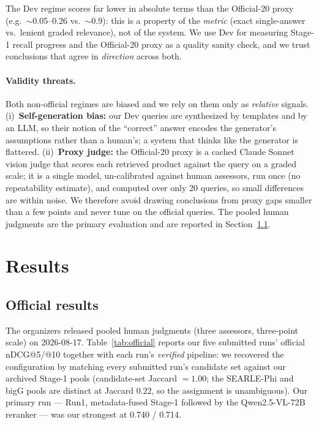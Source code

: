 \documentclass[sigconf,nonacm]{acmart}
\begin{document}
The Dev regime scores far lower in absolute terms than the Official-20 proxy
(e.g.\ $\sim$0.05--0.26 vs.\ $\sim$0.9): this is a property of the
\emph{metric} (exact single-answer vs.\ lenient graded relevance), not of
the system. We use Dev for measuring Stage-1 recall progress and the
Official-20 proxy as a quality sanity check, and we trust conclusions that
agree in \emph{direction} across both.

\paragraph{Validity threats.} Both non-official regimes are biased and we
rely on them only as \emph{relative} signals. (i)~\textbf{Self-generation
bias:} our Dev queries are synthesized by templates and by an LLM, so their
notion of the ``correct'' answer encodes the generator's assumptions rather
than a human's; a system that thinks like the generator is flattered.
(ii)~\textbf{Proxy judge:} the Official-20 proxy is a cached Claude
Sonnet vision judge that scores each retrieved product against the query on
a graded scale; it is a single model, un-calibrated against human assessors,
run once (no repeatability estimate), and computed over only 20 queries, so
small differences are within noise. We therefore avoid drawing conclusions
from proxy gaps smaller than a few points and never tune on the official
queries. The pooled human judgments are the primary evaluation and are
reported in Section~\ref{sec:official}.

\section{Results}
\label{sec:results}

\subsection{Official results}
\label{sec:official}
The organizers released pooled human judgments (three assessors, three-point
scale) on 2026-08-17. Table~\ref{tab:official} reports our five submitted runs'
official nDCG@5/@10 together with each run's \emph{verified} pipeline: we
recovered the configuration by matching every submitted run's candidate set
against our archived Stage-1 pools (candidate-set Jaccard $=1.00$; the
SEARLE-Phi and bigG pools are distinct at Jaccard $0.22$, so the assignment is
unambiguous). Our primary run --- Run1, metadata-fused Stage-1 followed by the
Qwen2.5-VL-72B reranker --- was our strongest at 0.740 / 0.714.
\end{document}

